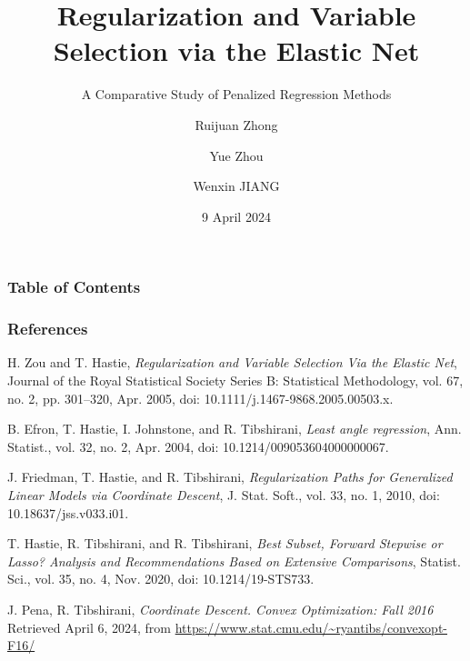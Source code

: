 \documentclass{beamer}
\title[GLM Net] %
{Regularization and Variable Selection via the Elastic Net}
\subtitle{A Comparative Study of Penalized Regression Methods}
\author[] %
{Ruijuan Zhong \and Yue Zhou \and Wenxin JIANG} %
\institute[BIOS] %
{
  Department of Biostatistics\\
  City University of Hong Kong
}
\date[April 2024] %
{9 April 2024}
\begin{document}
\frame{\titlepage}
\begin{frame}
\frametitle{Table of Contents}
\tableofcontents
\end{frame}







\begin{frame}[allowframebreaks]
\frametitle{References}

\begin{thebibliography}{99}
\small
{}
H. Zou and T. Hastie, \emph{Regularization and Variable Selection Via the Elastic Net}, Journal of the Royal Statistical Society Series B: Statistical Methodology, vol. 67, no. 2, pp. 301–320, Apr. 2005, doi: 10.1111/j.1467-9868.2005.00503.x.

B. Efron, T. Hastie, I. Johnstone, and R. Tibshirani, \emph{Least angle regression}, Ann. Statist., vol. 32, no. 2, Apr. 2004, doi: 10.1214/009053604000000067.

J. Friedman, T. Hastie, and R. Tibshirani, \emph{Regularization Paths for Generalized Linear Models via Coordinate Descent}, J. Stat. Soft., vol. 33, no. 1, 2010, doi: 10.18637/jss.v033.i01.

T. Hastie, R. Tibshirani, and R. Tibshirani, \emph{Best Subset, Forward Stepwise or Lasso? Analysis and Recommendations Based on Extensive Comparisons}, Statist. Sci., vol. 35, no. 4, Nov. 2020, doi: 10.1214/19-STS733.

J. Pena, R. Tibshirani, \emph{Coordinate Descent. Convex Optimization: Fall 2016} Retrieved April 6, 2024, from \url{https://www.stat.cmu.edu/~ryantibs/convexopt-F16/}

\end{thebibliography}

\end{frame}
\end{document}

